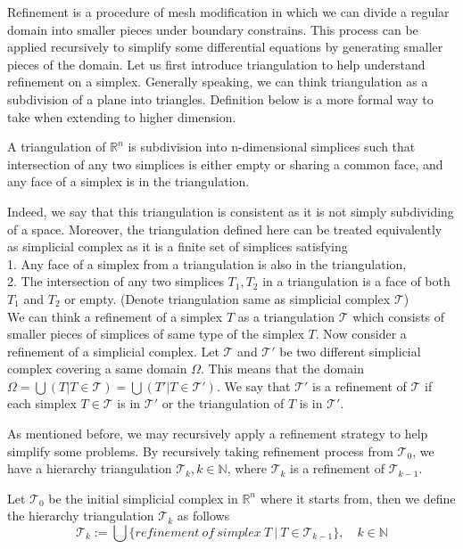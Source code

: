 Refinement is a procedure of mesh modification in which we can divide a regular domain into smaller pieces under boundary constrains. This process can be applied recursively to simplify some differential equations by generating smaller pieces of the domain. Let us first introduce triangulation to help understand refinement on a simplex. Generally speaking, we can think triangulation as a subdivision of a plane into triangles. Definition below is a more formal way to take when extending to higher dimension.
    \begin{definition*}
    A triangulation of $\mathbb R^n$ is subdivision into n-dimensional simplices such that intersection of any two simplices is either empty or sharing a common face, and any face of a simplex is in the triangulation.
    \end{definition*}
    Indeed, we say that this triangulation is consistent as it is not simply subdividing of a space. Moreover, the triangulation defined here can be treated equivalently as simplicial complex as it is a finite set of simplices satisfying\\
    1. Any face of a simplex from a triangulation is also in the triangulation,\\
    2. The intersection of any two simplices ${T}_1, {T}_2 $ in a triangulation is a face of both ${T}_1$ and  ${T}_2$ or empty.
    (Denote triangulation same as simplicial complex $\mathcal{T}$)\\
    

    We can think a refinement of a simplex $T$ as a triangulation $\mathcal{T}$ which consists of smaller pieces of simplices of same type of the simplex $T$. Now consider a refinement of a simplicial complex. Let $\mathcal{T}$ and $\mathcal{T'}$ be two different simplicial complex covering a same domain $\Omega$. This means that the domain \(\Omega = \displaystyle \bigcup({T \vert T\in \mathcal{T}}) = \bigcup({T' \vert T\in \mathcal{T'}})\). We say that $\mathcal{T'}$ is a refinement of $\mathcal{T}$ if each simplex $T\in\mathcal{T}$ is in $\mathcal{T'}$ or the triangulation of $T$ is in $\mathcal{T'}$.

    As mentioned before, we may recursively apply a refinement strategy to help simplify some problems. By recursively taking refinement process from $\mathcal{T}_0$, we have a hierarchy triangulation $\mathcal{T}_k, k\in\mathbb{N}$, where $\mathcal{T}_k$ is a refinement of $\mathcal{T}_{k-1}$. 
    \begin{definition*}
    Let $\mathcal{T}_0$ be the initial simplicial complex in $\mathbb{R}^n$ where it starts from, then we define the hierarchy triangulation $\mathcal{T}_k$ as follows
    \begin{equation*}
    \mathcal{T}_k := \bigcup\{refinement~of~simplex~T ~\vert ~T\in\mathcal{T}_{k-1}\}, \quad k\in\mathbb{N}
    \end{equation*}
    \end{definition*}


